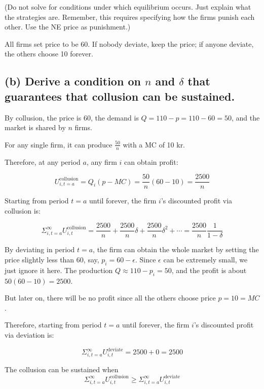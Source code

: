 \documentclass{article}
\begin{document}
\medskip 

(Do not solve for conditions under which equilibrium
occurs. Just explain what the strategies are. Remember, this requires
specifying how the firms punish each other. Use the NE
price as punishment.)

\bigskip

All firms set price to be 60. If nobody deviate, keep the price; if anyone deviate, the others choose 10 forever.

\subsection*{(b) Derive a condition on $n$ and $\delta$ that guarantees that collusion can be sustained.}

By collusion, the price is 60, the demand is $Q = 110 -p = 110- 60 =50$, and the
market is shared by $n$ firms.

\smallskip

For any single firm, it can produce $\frac{50}{n}$ with a MC of 10 kr.

\smallskip

Therefore, at any period $a$, any firm $i$ can obtain profit:


$$U^{\text{collusion}}_{i,t=a} = Q_i (p-MC) = \frac{50}{n}(60-10) = \frac {2500}{n} $$

Starting from period $t=a$ until forever, the firm $i$'s discounted profit via collusion is:

$$\Sigma^{\infty}_{i,t=a} U^{\text{collusion}}_{i,t}= \frac {2500}{n} + \frac {2500}{n} \delta + \frac {2500}{n}\delta^2 + \cdots = \frac {2500}{n} \frac{1}{1-\delta}$$


By deviating in period $t=a$, the firm can obtain the whole market by setting the price slightly less than $60$, say, $p_i = 60 -\epsilon$. Since $\epsilon$ can be extremely small, we just ignore it here. The production $Q \approx 110 - p_i = 50$, and the profit is about $50 (60 -10)=2500$. 

\smallskip

But later on, there will be no profit since all the others choose price $p=10=MC$. 

\smallskip

Therefore, starting from period $t=a$ until forever, the firm $i$'s discounted profit via deviation is:

$$\Sigma^{\infty}_{i,t=a} U^{\text{deviate}}_{i,t}= 2500  + 0 =2500$$

The collusion can be sustained when $$\Sigma^{\infty}_{i,t=a} U^{\text{collusion}}_{i,t} \ge \Sigma^{\infty}_{i,t=a} U^{\text{deviate}}_{i,t}$$
\end{document}
